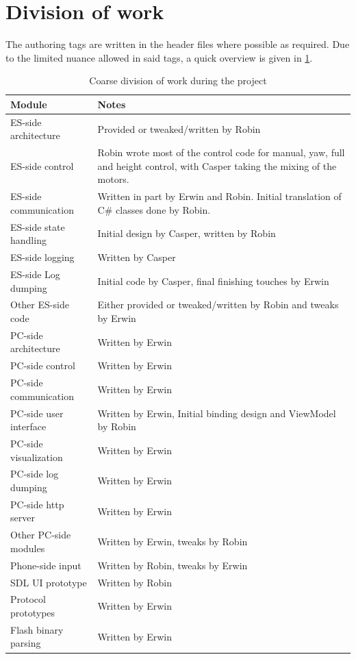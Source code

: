 \documentclass[final]{article}
\begin{document}
\section{Division of work}
The authoring tags are written in the header files where possible as required.
Due to the limited nuance allowed in said tags, a quick overview is given in \cref{tab:work-division}.

\begin{table}[H]
    \caption{Coarse division of work during the project}
    \label{tab:work-division}
    \centering
    \begin{tabular}{lp{12cm}}
    \toprule
    Module                   & Notes \\
    \midrule
    ES-side architecture & Provided or tweaked/written by Robin \\
    ES-side control & Robin wrote most of the control code for manual, yaw, full and height control, with Casper taking the mixing of the motors. \\
    ES-side communication & Written in part by Erwin and Robin. Initial translation of C\# classes done by Robin.\\
    ES-side state handling & Initial design by Casper, written by Robin \\
    ES-side logging & Written by Casper \\
    ES-side Log dumping & Initial code by Casper, final finishing touches by Erwin \\
    Other ES-side code & Either provided or tweaked/written by Robin and tweaks by Erwin \\
    \midrule
    PC-side architecture & Written by Erwin \\
    PC-side control & Written by Erwin \\
    PC-side communication & Written by Erwin \\
    PC-side user interface & Written by Erwin, Initial binding design and ViewModel by Robin \\
    PC-side visualization & Written by Erwin \\
    PC-side log dumping & Written by Erwin \\
    PC-side http server & Written by Erwin \\
    Other PC-side modules & Written by Erwin, tweaks by Robin \\
    \midrule
    Phone-side input & Written by Robin, tweaks by Erwin \\
    SDL UI prototype & Written by Robin \\
    Protocol prototypes & Written by Erwin \\
    Flash binary parsing & Written by Erwin \\
    \bottomrule
    \end{tabular}
\end{table}
\end{document}
